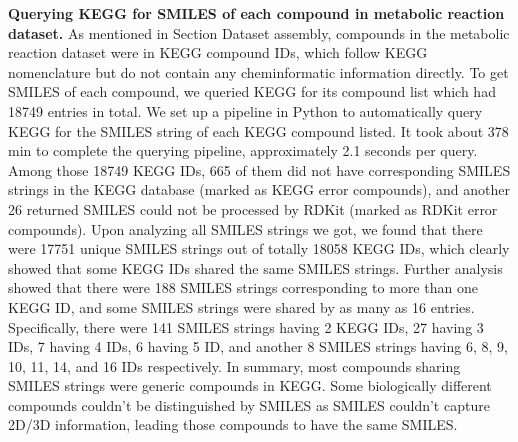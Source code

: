 \documentclass{article}
\begin{document}
\textbf{Querying KEGG for SMILES of each compound in metabolic reaction dataset.} 
As mentioned in Section Dataset assembly, compounds in the metabolic reaction dataset were in KEGG compound IDs, which follow KEGG nomenclature but do not contain any cheminformatic information directly. 
To get SMILES of each compound, we queried KEGG for its compound list which had 18749 entries in total.
We set up a pipeline in Python to automatically query KEGG for the SMILES string of each KEGG compound listed. 
It took about 378 min to complete the querying pipeline, approximately 2.1 seconds per query. 
Among those 18749 KEGG IDs, 665 of them did not have corresponding SMILES strings in the KEGG database (marked as KEGG error compounds), and another 26 returned SMILES could not be processed by RDKit (marked as RDKit error compounds).
Upon analyzing all SMILES strings we got, we found that there were 17751 unique SMILES strings out of totally 18058 KEGG IDs, which clearly showed that some KEGG IDs shared the same SMILES strings. 
Further analysis showed that there were 188 SMILES strings corresponding to more than one KEGG ID, and some SMILES strings were shared by as many as 16 entries. 
Specifically, there were 141 SMILES strings having 2 KEGG IDs, 27 having 3 IDs, 7 having 4 IDs, 6 having 5 ID, and another 8 SMILES strings having 6, 8, 9, 10, 11, 14, and 16 IDs respectively. 
In summary, most compounds sharing SMILES strings were generic compounds in KEGG. 
Some biologically different compounds couldn't be distinguished by SMILES as SMILES couldn't capture 2D/3D information, leading those compounds to have the same SMILES. 

\end{document}

